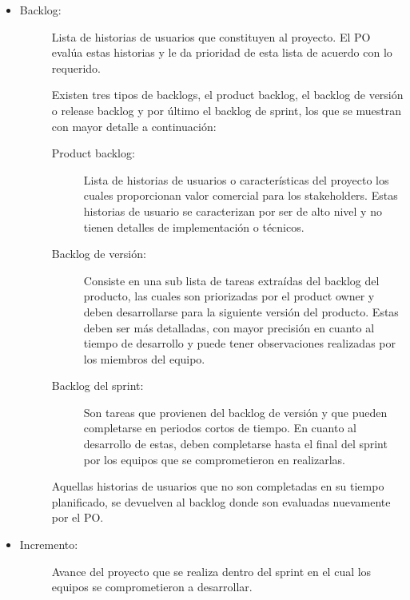 \begin{itemize}
    \item   \begin{description}

                \item[Backlog: ] Lista de historias de usuarios que constituyen al proyecto. El PO evalúa estas historias y le da prioridad de esta lista de acuerdo con lo requerido.
                
                Existen tres tipos de backlogs, el product backlog, el backlog de versión o release backlog y por último el backlog de sprint, los que se muestran con mayor detalle a continuación:
                
                \begin{description}
                    \item[Product backlog: ] Lista de historias de usuarios o características del proyecto los cuales proporcionan valor comercial para los stakeholders. Estas historias de usuario se caracterizan por ser de alto nivel y no tienen detalles de implementación o técnicos.
                        
                    \item[Backlog de versión: ]  Consiste en una sub lista de tareas extraídas del backlog del producto, las cuales son priorizadas por el product owner y deben desarrollarse para la siguiente versión del producto. Estas deben ser más detalladas, con mayor precisión en cuanto al tiempo de desarrollo y puede tener observaciones realizadas por los miembros del equipo.
                        
                    \item[Backlog del sprint: ] Son tareas que provienen del backlog de versión y que pueden completarse en periodos cortos de tiempo. En cuanto al desarrollo de estas, deben completarse hasta el final del sprint por los equipos que se comprometieron en realizarlas.
                \end{description} 

                Aquellas historias de usuarios que no son completadas en su tiempo planificado, se devuelven al backlog donde son evaluadas nuevamente por el PO.
            \end{description}    

    \item   \begin{description}
                \item[Incremento:] Avance del proyecto que se realiza dentro del sprint en el cual los equipos se comprometieron a desarrollar.
            \end{description}
    

\end{itemize}
